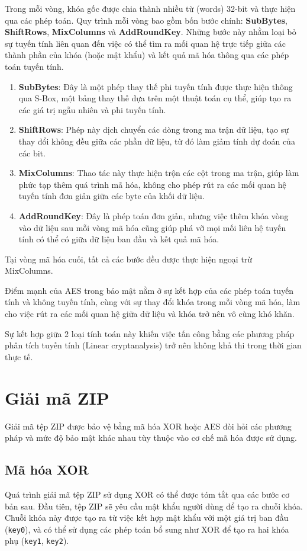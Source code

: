 \documentclass[../DoAn.tex]{subfiles}
\begin{document}
Trong mỗi vòng, khóa gốc được chia thành nhiều từ (words) 32-bit và thực hiện qua các phép toán. Quy trình mỗi vòng bao gồm bốn bước chính: \textbf{SubBytes}, \textbf{ShiftRows}, \textbf{MixColumns} và \textbf{AddRoundKey}. Những bước này nhằm loại bỏ sự tuyến tính liên quan đến việc có thể tìm ra mối quan hệ trực tiếp giữa các thành phần của khóa (hoặc mật khẩu) và kết quả mã hóa thông qua các phép toán tuyến tính. 
\begin{enumerate}
    \item \textbf{SubBytes}: Đây là một phép thay thế phi tuyến tính được thực hiện thông qua S-Box, một bảng thay thế dựa trên một thuật toán cụ thể, giúp tạo ra các giá trị ngẫu nhiên và phi tuyến tính. 
    \item \textbf{ShiftRows}: Phép này dịch chuyển các dòng trong ma trận dữ liệu, tạo sự thay đổi không đều giữa các phần dữ liệu, từ đó làm giảm tính dự đoán của các bit. 
    \item \textbf{MixColumns}: Thao tác này thực hiện trộn các cột trong ma trận, giúp làm phức tạp thêm quá trình mã hóa, không cho phép rút ra các mối quan hệ tuyến tính đơn giản giữa các byte của khối dữ liệu. 
    \item \textbf{AddRoundKey}: Đây là phép toán đơn giản, nhưng việc thêm khóa vòng vào dữ liệu sau mỗi vòng mã hóa cũng giúp phá vỡ mọi mối liên hệ tuyến tính có thể có giữa dữ liệu ban đầu và kết quả mã hóa. 
\end{enumerate}

Tại vòng mã hóa cuối, tất cả các bước đều được thực hiện ngoại trừ MixColumns. 

Điểm mạnh của AES trong bảo mật nằm ở sự kết hợp của các phép toán tuyến tính và không tuyến tính, cùng với sự thay đổi khóa trong mỗi vòng mã hóa, làm cho việc rút ra các mối quan hệ giữa dữ liệu và khóa trở nên vô cùng khó khăn.

Sự kết hợp giữa 2 loại tính toán này khiến việc tấn công bằng các phương pháp phân tích tuyến tính (Linear cryptanalysis) trở nên không khả thi trong thời gian thực tế.

\section{Giải mã ZIP}
\label{section:2.3}
Giải mã tệp ZIP được bảo vệ bằng mã hóa XOR hoặc AES đòi hỏi các phương pháp và mức độ bảo mật khác nhau tùy thuộc vào cơ chế mã hóa được sử dụng. 
\subsection{Mã hóa XOR}
\label{subsection:2.2.3}
Quá trình giải mã tệp ZIP sử dụng XOR có thể được tóm tắt qua các bước cơ bản sau. Đầu tiên, tệp ZIP sẽ yêu cầu mật khẩu người dùng để tạo ra chuỗi khóa. Chuỗi khóa này được tạo ra từ việc kết hợp mật khẩu với một giá trị ban đầu (\verb|key0|), và có thể sử dụng các phép toán bổ sung như XOR để tạo ra hai khóa phụ (\verb|key1|, \verb|key2|).
\end{document}
